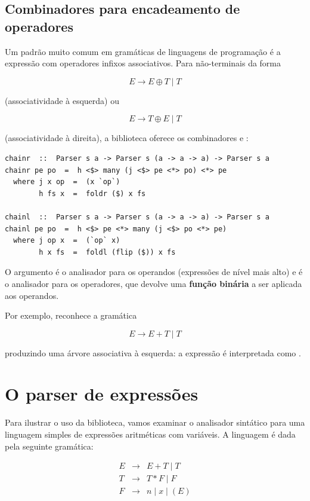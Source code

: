 \subsection{Combinadores para encadeamento de operadores}

Um padrão muito comum em gramáticas de linguagens de programação é a
expressão com operadores infixos associativos. Para não-terminais da forma

\[
  E \to E \oplus T \mid T
\]

(associatividade à esquerda) ou

\[
  E \to T \oplus E \mid T
\]

(associatividade à direita), a biblioteca oferece os combinadores
 e :

\begin{verbatim}
chainr  ::  Parser s a -> Parser s (a -> a -> a) -> Parser s a
chainr pe po  =  h <$> many (j <$> pe <*> po) <*> pe
  where j x op  =  (x `op`)
        h fs x  =  foldr ($) x fs

chainl  ::  Parser s a -> Parser s (a -> a -> a) -> Parser s a
chainl pe po  =  h <$> pe <*> many (j <$> po <*> pe)
  where j op x  =  (`op` x)
        h x fs  =  foldl (flip ($)) x fs
\end{verbatim}

O argumento  é o analisador para os
operandos (expressões de nível mais alto) e
 é o analisador para os operadores, que
devolve uma \textbf{função binária} a ser aplicada aos operandos.

Por exemplo, 
reconhece a gramática

\[
  E \to E + T \mid T
\]

produzindo uma árvore associativa à esquerda: a expressão
 é interpretada como
.

\section{O parser de expressões}

Para ilustrar o uso da biblioteca, vamos examinar o analisador
sintático para uma linguagem simples de expressões aritméticas com
variáveis. A linguagem é dada pela seguinte gramática:

\[
  \begin{array}{lcl}
    E & \to & E + T \mid T\\
    T & \to & T * F \mid F\\
    F & \to & n \mid x \mid (E)
  \end{array}
\]

